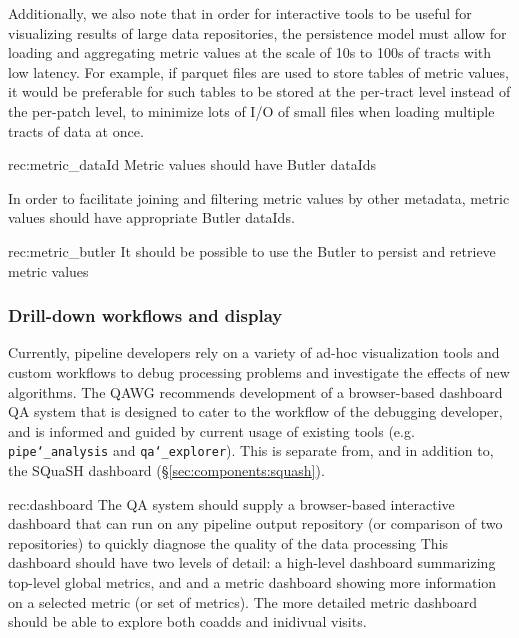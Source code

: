 Additionally, we also note that in order for interactive tools to be useful for visualizing results of large data repositories, the persistence model must allow for loading and aggregating metric values at the scale of 10s to 100s of tracts with low latency.
For example, if parquet files are used to store tables of metric values, it would be preferable for such tables to be stored at the per-tract level instead of the per-patch level, to minimize lots of I/O of small files when loading multiple tracts of data at once.


\begin{recommendation}
    {rec:metric_dataId}
    {Metric values should have Butler dataIds}
\end{recommendation}

In order to facilitate joining and filtering metric values by other metadata, metric values should have appropriate Butler dataIds.

\begin{recommendation}
    {rec:metric_butler}
    {It should be possible to use the Butler to persist and retrieve metric values}
\end{recommendation}

\subsubsection{Drill-down workflows and display} \label{sec:metric_displays}

Currently, pipeline developers rely on a variety of ad-hoc visualization tools and custom workflows to debug processing problems and investigate the effects of new algorithms.
The QAWG recommends development of a browser-based dashboard QA system that is designed to cater to the workflow of the debugging developer, and is informed and guided by current usage of existing tools (e.g. \texttt{pipe\char`_analysis} and \texttt{qa\char`_explorer}).
This is separate from, and in addition to, the SQuaSH dashboard (\S \ref{sec:components:squash}).

\begin{recommendation}
    {rec:dashboard}
    {The QA system should supply a browser-based interactive dashboard that can run on any pipeline output repository (or comparison of two repositories) to quickly diagnose the quality of the data processing}
This dashboard should have two levels of detail: a high-level dashboard summarizing top-level global metrics, and and a metric dashboard showing more information on a selected metric (or set of metrics).  The more detailed metric dashboard should be able to explore both coadds and inidivual visits.
\end{recommendation}


